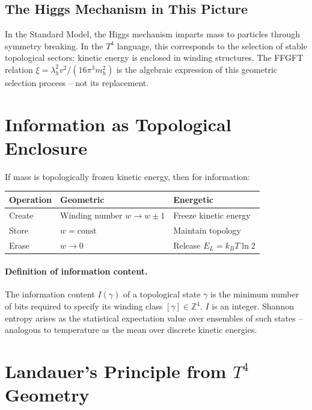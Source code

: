 \subsection{The Higgs Mechanism in This Picture}

In the Standard Model, the Higgs mechanism imparts mass to particles
through symmetry breaking. In the \(T^4\) language, this corresponds
to the selection of stable topological sectors: kinetic energy is
enclosed in winding structures.
The FFGFT relation \(\xi = \lambda_h^2 v^2 / (16\pi^3 m_h^2)\)
is the algebraic expression of this geometric selection process --
not its replacement.

\section{Information as Topological Enclosure}

If mass is topologically frozen kinetic energy, then for information:

\begin{center}
\renewcommand{\arraystretch}{1.4}
\begin{tabular}{lll}
\toprule
\textbf{Operation} & \textbf{Geometric} & \textbf{Energetic} \\
\midrule
Create  & Winding number \(w \to w\pm1\) & Freeze kinetic energy \\
Store   & \(w = \mathrm{const}\)         & Maintain topology \\
Erase   & \(w \to 0\)                    & Release \(E_L = k_BT\ln2\) \\
\bottomrule
\end{tabular}
\end{center}

\paragraph{Definition of information content.}
The information content \(I(\gamma)\) of a topological state \(\gamma\)
is the minimum number of bits required to specify its winding class
\([\gamma] \in \mathbb{Z}^4\).
\(I\) is an integer.
Shannon entropy arises as the statistical expectation value over
ensembles of such states -- analogous to temperature as the mean
over discrete kinetic energies.

\section{Landauer's Principle from \(T^4\) Geometry}

